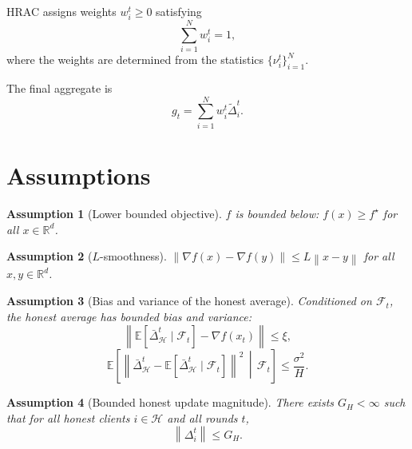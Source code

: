 \documentclass[11pt,a4paper]{article}
\newtheorem{assumption}{Assumption}
\theoremstyle{remark}
\newcommand{\R}{\mathbb{R}}
\newcommand{\E}{\mathbb{E}}
\newcommand{\F}{\mathcal{F}}
\newcommand{\HH}{\mathcal{H}}
\newcommand{\norm}[1]{\left\lVert #1 \right\rVert}
\begin{document}
HRAC assigns weights \(w_i^t \ge 0\) satisfying
\begin{equation}
    \sum_{i=1}^N w_i^t = 1,
    \label{eq:weight_simplex}
\end{equation}
where the weights are determined from the statistics
\(\{\nu_i^t\}_{i=1}^N\).

The final aggregate is
\begin{equation}
    g_t = \sum_{i=1}^N w_i^t \tilde{\Delta}_i^t.
    \label{eq:aggregate}
\end{equation}

\section{Assumptions}

\begin{assumption}[Lower bounded objective]
\label{ass:lower_bounded}
\(f\) is bounded below: \(f(x)\ge f^\star\) for all \(x\in\R^d\).
\end{assumption}

\begin{assumption}[\(L\)-smoothness]
\label{ass:smooth}
\(\norm{\nabla f(x)-\nabla f(y)}\le L\norm{x-y}\) for all \(x,y\in\R^d\).
\end{assumption}

\begin{assumption}[Bias and variance of the honest average]
\label{ass:bias_variance}
Conditioned on \(\F_t\), the honest average has bounded bias and variance:
\begin{equation}
    \norm{
        \E\!\left[\bar{\Delta}_{\HH}^t \mid \F_t\right] - \nabla f(x_t)
    }
    \le \xi,
    \label{eq:bias}
\end{equation}
\begin{equation}
    \E\!\left[
        \norm{
            \bar{\Delta}_{\HH}^t -
            \E\!\left[\bar{\Delta}_{\HH}^t \mid \F_t\right]
        }^2
        \,\middle|\, \F_t
    \right]
    \le \frac{\sigma^2}{H}.
    \label{eq:variance}
\end{equation}
\end{assumption}

\begin{assumption}[Bounded honest update magnitude]
\label{ass:honest_update_bound}
There exists \(G_H<\infty\) such that for all honest clients \(i\in\HH\) and
all rounds \(t\),
\begin{equation}
    \norm{\Delta_i^t}\le G_H.
    \label{eq:honest_update_bound}
\end{equation}
\end{assumption}
\end{document}
